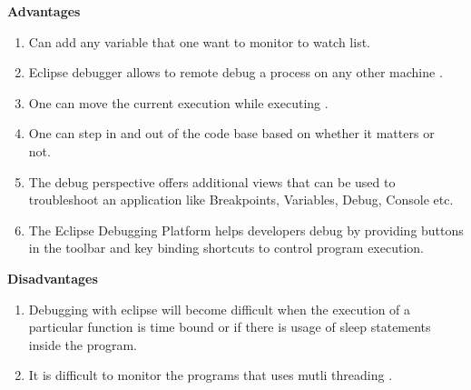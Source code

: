 \documentclass[a4paper, 11pt]{report}
\begin{document}
\textbf{Advantages}

\begin{enumerate}
  \item Can add any variable that one want to monitor to watch list.\
  \item Eclipse debugger allows to remote debug a process on any other machine .\
  \item One can move the current execution while executing . \
  \item One can step in and out of the code base based on whether it matters or not.\
  \item The debug perspective offers additional views that can be used to troubleshoot an application like Breakpoints, Variables, Debug, Console etc. \
  \item The Eclipse Debugging Platform helps developers debug by providing buttons in the toolbar and key binding shortcuts to control program execution. \
\end{enumerate}

\textbf{Disadvantages}
\begin{enumerate}
\item Debugging with eclipse will become difficult when the execution  of a particular function is time bound or if there is usage of sleep statements inside the program. \
\item It is difficult to monitor the programs that uses mutli threading . \
\end{enumerate}
\newpage
\end{document}

